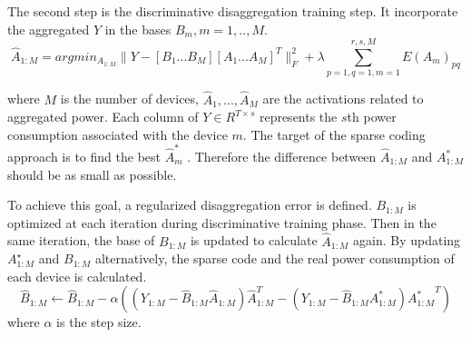 The second step is the discriminative disaggregation training step. 
It incorporate the aggregated $Y$ in the bases $B_m, m=1,..,M$. 
\begin{equation}
\hat{A}_{1:M} = arg min_{A_{1:M}} \parallel Y- [B_1...B_M][A_1...A_M]^T \parallel^2_F + \lambda\sum_{p=1,q=1,m=1}^{r,s,M}E(A_m)_{pq}
\end{equation}

where $M$ is the number of devices, 
$\hat{A}_1,...,\hat{A}_M$ are the activations related to aggregated power. 
Each column of $Y \in R^{T \times s}$ represents the $s$th power consumption 
associated with the device $m$. 
The target of the sparse coding approach is to find the best $\hat{A}^*_m$ . 
Therefore the difference between $\hat{A}_{1:M}$ and $A^*_{1:M}$ should be 
as small as possible.

To achieve this goal, a regularized disaggregation error is defined. 
$B_{1:M}$ is optimized at each iteration during
discriminative training phase. 
Then in the same iteration,
the base of $B_{1:M}$ is updated to calculate $\hat{A}_{1:M}$ again.
By updating $A_{1:M}^\star$ and $B_{1:M}$ alternatively,
the sparse code and the real power consumption of each device 
is calculated.
\begin{equation}
 \hat{B}_{1:M} \leftarrow \hat{B}_{1:M} - \alpha ((Y_{1:M}-\hat{B}_{1:M}\hat{A}_{1:M}) \hat{A}^T_{1:M} - (Y_{1:M}-\hat{B}_{1:M}A^*_{1:M}){A^*_{1:M}}^T) 
 \end{equation}
where $\alpha$ is the step size. 




